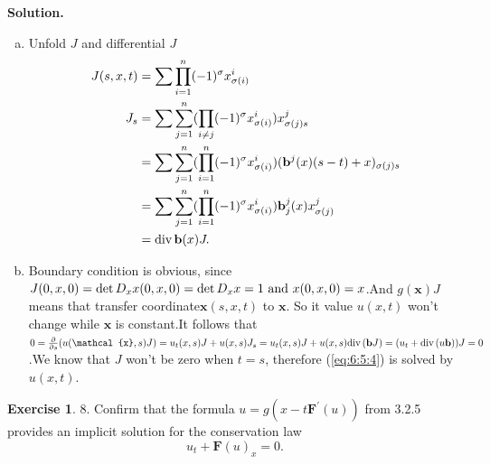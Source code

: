 \documentclass[a4paper]{book}
\newenvironment{solution}%
{\noindent\textbf{Solution.}}%
{\qedhere}
\numberwithin{equation}{chapter}
\theoremstyle{definition}
\newtheorem{exc}[exm]{Exercise}
\begin{document}
\begin{solution}
  \begin{enumerate} [(a)]
  \item Unfold $J$ and differential $J$
    \begin{align*}
      J(s,x,t) &= \sum \prod_{i = 1}^n (-1)^{\sigma} x^i_{\sigma(i)} \\
      J_s &= \sum \sum_{j = 1}^n (\prod_{i \neq j} (-1)^{\sigma} x^i_{\sigma(i)}) x^j_{\sigma(j) s}  \\
               &= \sum \sum _{j = 1}^n (\prod_{i=1}^n (-1)^{\sigma} x^i_{\sigma(i)}) (\mathbf{b}^j(x)(s -t) + x)_{\sigma(j)s} \\
               &=  \sum \sum _{j = 1}^n (\prod_{i=1}^n (-1)^{\sigma} x^i_{\sigma(i)}) \mathbf{b}^j_j(x)x^j_{\sigma(j)}  \\
      &= \textmd{div}\, \mathbf{b}(x)J.
    \end{align*}

  \item Boundary condition is obvious, since $J(0,x,0) = \det D_x x(0,x,0) = \det D_x x = 1 \textmd{ and } x(0,x,0) = x$.And $g(\mathbf{x}) J$ means that transfer coordinate$\mathbf{x}(s,x,t)$ to $\mathbf{x}$. So it value $u(x,t)$ won't change while $\mathbf{x}$ is constant.It follows that $0 = \frac{\partial}{\partial s}(u(\mathcal{x},s)J) = u_t(x,s)J + u(x,s)J_s = u_t(x,s)J + u(x,s)\textmd{div}\, (\mathbf{b}J) = (u_t + \textmd{div}\, (u\mathbf{b}))J = 0$.We know that $J$ won't be zero when $t = s$, therefore (\ref{eq:6:5:4}) is solved by $u(x,t)$.
  \end{enumerate}
\end{solution}

\begin{exc}
  8.  Confirm that the formula $u = g(x - t \mathbf{F}^\prime (u))$ from 3.2.5 provides an implicit solution for the conservation law
  \begin{equation}
    \label{eq:6:6:1}
    u_t + \mathbf{F}(u)_x = 0.
  \end{equation}
\end{exc}
\end{document}
